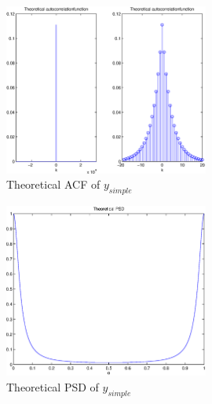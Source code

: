 \documentclass[10pt]{article}
\begin{document}
\begin{figure}[!hp]

    \begin{center}
      \includegraphics[width=0.6\textwidth]{TheoACF}
    \caption{Theoretical ACF of $y_{simple}$ \label{fig:TheoACFsimple}}
    \end{center}

\end{figure}

\begin{figure}[!hp]

    \begin{center}
      \includegraphics[width=0.6\textwidth]{TheoPSD}
    \caption{Theoretical PSD of $y_{simple}$ \label{fig:TheoPSDsimple}}
    \end{center}

\end{figure}
\end{document}
